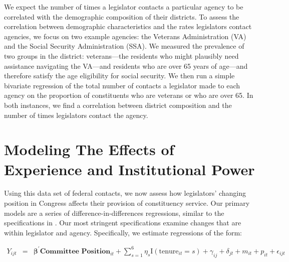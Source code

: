 \documentclass[12pt]{article}
\begin{document}
We expect the number of times a legislator contacts a particular agency to be correlated with the demographic composition of their districts. To assess the correlation between demographic characteristics and the rates legislators contact agencies, we focus on two example agencies: the Veterans Administration (VA) and the Social Security Administration (SSA). We measured the prevalence of two groups in the district: veterans---the residents who might plausibly need assistance navigating the VA---and residents who are over 65 years of age---and therefore satisfy the age eligibility for social security. We then run a simple bivariate regression of the total number of contacts a legislator made to each agency on the proportion of constituents who are veterans or who are over 65.  
In both instances, we find a correlation between district composition and the number of times legislators contact the agency. %


\section{Modeling The Effects of Experience and Institutional Power}\label{s:prestige} 

Using this data set of federal contacts, we now assess how legislators' changing position in Congress affects their provision of constituency service. Our primary models are a series of difference-in-differences regressions, similar to the specifications in \cite{BerryFowler2016}. Our most stringent specifications examine changes that are within legislator and agency. Specifically, we estimate regressions of the form: 

\begin{eqnarray}
Y_{ijt} & = & \boldsymbol{\beta}^{'} \textbf{Committee Position}_{it}  + \sum_{s = 1}^{6} \eta_{s} \text{I}\left(\text{tenure}_{it} = s\right) + \gamma_{ij} + \delta_{jt} + m_{it} + p_{it} + \epsilon_{ijt} \label{e:diff1}
\end{eqnarray}
\end{document}
